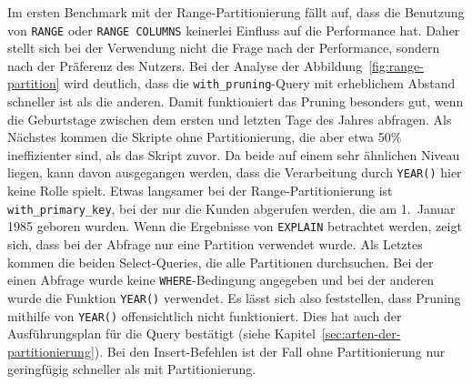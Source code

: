 Im ersten Benchmark mit der Range-Partitionierung fällt auf, dass die Benutzung von \texttt{RANGE} oder \texttt{RANGE COLUMNS} keinerlei Einfluss auf die Performance hat.
Daher stellt sich bei der Verwendung nicht die Frage nach der Performance, sondern nach der Präferenz des Nutzers.
Bei der Analyse der Abbildung~\ref{fig:range-partition} wird deutlich, dass die \texttt{with\_pruning}-Query mit erheblichem Abstand schneller ist als die anderen.
Damit funktioniert das Pruning besonders gut, wenn die Geburtstage zwischen dem ersten und letzten Tage des Jahres abfragen.
Als Nächstes kommen die Skripte ohne Partitionierung, die aber etwa 50\% ineffizienter sind, als das Skript zuvor.
Da beide auf einem sehr ähnlichen Niveau liegen, kann davon ausgegangen werden, dass die Verarbeitung durch \texttt{YEAR()} hier keine Rolle spielt.
Etwas langsamer bei der Range-Partitionierung ist \texttt{with\_primary\_key}, bei der nur die Kunden abgerufen werden, die am 1.\ Januar 1985 geboren wurden.
Wenn die Ergebnisse von \texttt{EXPLAIN} betrachtet werden, zeigt sich, dass bei der Abfrage nur eine Partition verwendet wurde.
Als Letztes kommen die beiden Select-Queries, die alle Partitionen durchsuchen.
Bei der einen Abfrage wurde keine \texttt{WHERE}-Bedingung angegeben und bei der anderen wurde die Funktion \texttt{YEAR()} verwendet.
Es lässt sich also feststellen, dass Pruning mithilfe von \texttt{YEAR()} offensichtlich nicht funktioniert.
Dies hat auch der Ausführungsplan für die Query bestätigt (siehe Kapitel~\ref{sec:arten-der-partitionierung}).
Bei den Insert-Befehlen ist der Fall ohne Partitionierung nur geringfügig schneller als mit Partitionierung.

